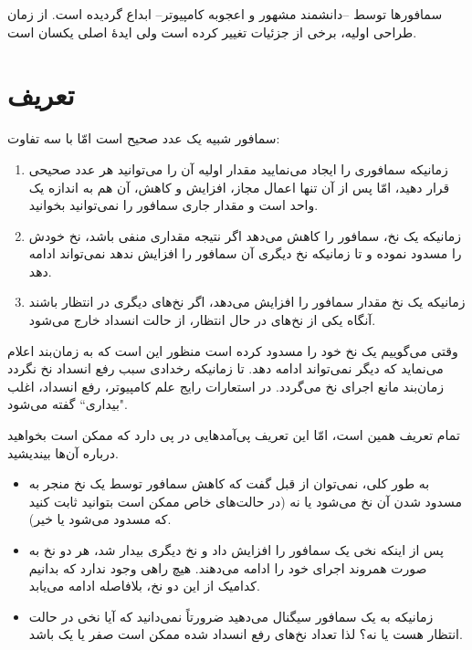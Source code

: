 \documentclass{book}
\begin{document}
    سمافورها توسط  --دانشمند مشهور و اعجوبه کامپیوتر-- ابداع گردیده است. 
    از زمان طراحی اولیه، برخی از جزئیات تغییر کرده است ولی ایدهٔ اصلی یکسان است. 

\section{تعریف}
    سمافور شبیه یک عدد صحیح است امّا با سه تفاوت: 

\begin{enumerate}

\item 
    زمانیکه سمافوری را ایجاد می‌نمایید مقدار اولیه آن را می‌توانید هر عدد صحیحی قرار دهید، 
    امّا پس از آن تنها اعمال مجاز، افزایش و کاهش، آن هم 
    به اندازه یک واحد است و مقدار جاری سمافور را نمی‌توانید بخوانید. 

\item 
    زمانیکه یک نخ، سمافور را کاهش می‌دهد اگر نتیجه  مقداری منفی باشد، نخ \space خودش را مسدود نموده 
    و تا زمانیکه نخ دیگری آن سمافور را افزایش ندهد نمی‌تواند ادامه دهد. 
\item 
    زمانیکه یک نخ مقدار سمافور را افزایش می‌دهد، اگر نخ‌های دیگری در انتظار باشند آنگاه یکی از نخ‌های در حال انتظار،‌ از حالت انسداد خارج می‌شود. 

\end{enumerate}

    وقتی می‌گوییم یک نخ خود را مسدود کرده است 
    منظور این است که به زمان‌بند اعلام می‌نماید که دیگر نمی‌تواند ادامه دهد. 
    تا زمانیکه رخدادی سبب رفع انسداد نخ نگردد زمان‌بند مانع اجرای نخ می‌گردد. 
    در استعارات رایج علم کامپیوتر، رفع انسداد، اغلب "بیداری`` گفته می‌شود.

    تمام تعریف همین است،‌ امّا این تعریف پی‌آمدهایی در پی دارد که ممکن است بخواهید درباره آن‌ها بیندیشید.
 
\begin{itemize}

\item 
    به طور کلی، نمی‌توان از قبل گفت که کاهش سمافور توسط یک نخ منجر به مسدود شدن آن نخ می‌شود یا نه 
    (در حالت‌های خاص ممکن است بتوانید ثابت کنید که مسدود می‌شود یا خیر).


\item 
    پس از اینکه نخی یک سمافور را افزایش داد و نخ دیگری بیدار شد، هر دو نخ به صورت همروند اجرای خود را ادامه می‌دهند. 
    هیچ راهی وجود ندارد که بدانیم کدامیک از این دو نخ، بلافاصله ادامه می‌یابد. 

\item 
    زمانیکه به یک سمافور سیگنال می‌دهید ضرورتاً نمی‌دانید که آیا نخی در حالت انتظار هست یا نه؟ لذا تعداد نخ‌های رفع انسداد شده ممکن است 
    صفر یا یک باشد. 

\end{itemize}
\end{document}
